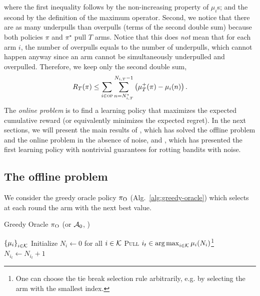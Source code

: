 where the first inequality follows by the non-increasing property of $\mu_i$s; and the second by the definition of the maximum operator. Second, we notice that there are as many underpulls than overpulls (terms of the second double sum) because both policies $ \pi$ and $\pi^\star$ pull $T$ arms. Notice that this does \emph{not} mean that for each arm $i$, the number of overpulls equals to the number of underpulls, which cannot happen anyway since an arm cannot be simultaneously underpulled and overpulled. Therefore, we keep only the second double sum,
\begin{equation}
\label{eq:regret-first-bound}
R_T(\pi) \leq \sum_{i\in \textsc{op}}   \sum_{n=N_{i,T}^\star}^{N_{i,T}-1} \left(\mu^+_T(\pi) - \mu_i(n)\right).
\end{equation}
%
The \textit{online problem} is to find a learning policy that maximizes the expected cumulative reward (or equivalently minimizes the expected regret). In the next sections, we will present the main results of \citet{heidari2016tight}, which has solved the offline problem and the online problem in the absence of noise, and \citet{levine2017rotting}, which has presented the first learning policy with nontrivial guarantees for rotting bandits with noise. 
%
\subsection{The offline problem \citep{heidari2016tight}}
\label{ss:rested-offline}
We consider the greedy oracle policy $\pi_{\rm O}$ (Alg.~\ref{alg:greedy-oracle}) which selects at each round the arm with the next best value.

\begin{minipage}{\textwidth}
\renewcommand*\footnoterule{}
\begin{savenotes}
\begin{algorithm}[H]
\caption{Greedy Oracle $\pi_{\rm O}$ (or $\mathcal{A}_{\rm 0}$, \citet{heidari2016tight})}
\label{alg:greedy-oracle}
\begin{algorithmic}[1]
	\Require $\left\{\mu_i\right\}_{i \in \mathcal{K}}$
	\State Initialize $N_i \leftarrow 0$ for all $i \in \mathcal{K}$
		\State \textsc{Pull}  $i_t \in \operatorname*{arg\,max}_{i \in \mathcal{K}} \mu_i(N_{i})$\footnote{One can choose the tie break selection rule arbitrarily, e.g. by selecting the arm with the smallest index.}
		\State $N_{i_t} \leftarrow N_{i_t} + 1$
	\EndFor
\end{algorithmic}
\end{algorithm}
\end{savenotes}
\end{minipage}


